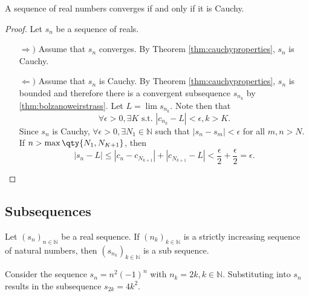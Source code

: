 \documentclass[../notes.tex]{subfiles}
\begin{document}
\begin{theorem}
    A sequence of real numbers converges if and only if it is Cauchy.
\end{theorem}
\begin{proof}
    Let $s_n$ be a sequence of reals.
    \begin{enumerate}
        \item[$\Rightarrow)$] %
        Assume that $s_n$ converges. By Theorem \ref{thm:cauchyproperties}, $s_n$ is Cauchy.
        \item[$\Leftarrow)$] %
        Assume that $s_n$ is Cauchy. By Theorem \ref{thm:cauchyproperties}, $s_n$ is bounded and therefore there is a convergent subsequence $s_{n_k}$ by \ref{thm:bolzanoweirstrass}. Let $L = \lim s_{n_k}$. Note then that
        \[
            \forall \epsilon > 0, \exists K \text{ s.t. } |c_{n_k} - L | < \epsilon, k > K
        .\]
        Since $s_n$ is Cauchy, $\forall \epsilon > 0, \exists N_1 \in \mathbb{N}$ such that $|s_n - s_m| < \epsilon$ for all $m,n > N$. If $n > \max\qty{N_1, N_{K+1}}$, then
        \[
            |s_n - L| \leq |c_n - c_{N_{k+1}}| + |c_{N_{k+1}} - L| < \frac{\epsilon}{2} + \frac{\epsilon}{2} = \epsilon
        .\]
    \end{enumerate}
\end{proof}

\subsection{Subsequences}

\begin{definition}[Subsequence]
    Let $(s_n)_{n\in \mathbb{N}}$ be a real sequence. If $(n_k)_{k \in \mathbb{N}}$ is a strictly increasing sequence of natural numbers, then $(s_{n_k})_{k\in \mathbb{N}}$ is a sub sequence.
\end{definition}

\begin{example}
    Consider the sequence $s_n = n^2 (-1)^n$ with $n_k = 2k, k \in \mathbb{N}$. Substituting into $s_n$ results in the subsequence $s_{2k} = 4k^2$.
\end{example}
\end{document}
